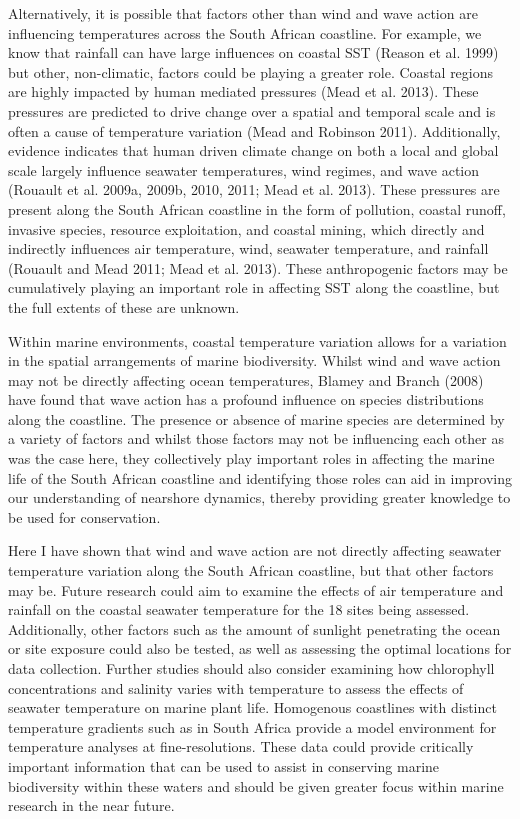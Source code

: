 \documentclass[12pt,]{article}
\begin{document}
Alternatively, it is possible that factors other than wind and wave
action are influencing temperatures across the South African coastline.
For example, we know that rainfall can have large influences on coastal
SST (Reason et al. 1999) but other, non-climatic, factors could be
playing a greater role. Coastal regions are highly impacted by human
mediated pressures (Mead et al. 2013). These pressures are predicted to
drive change over a spatial and temporal scale and is often a cause of
temperature variation (Mead and Robinson 2011). Additionally, evidence
indicates that human driven climate change on both a local and global
scale largely influence seawater temperatures, wind regimes, and wave
action (Rouault et al. 2009a, 2009b, 2010, 2011; Mead et al. 2013).
These pressures are present along the South African coastline in the
form of pollution, coastal runoff, invasive species, resource
exploitation, and coastal mining, which directly and indirectly
influences air temperature, wind, seawater temperature, and rainfall
(Rouault and Mead 2011; Mead et al. 2013). These anthropogenic factors
may be cumulatively playing an important role in affecting SST along the
coastline, but the full extents of these are unknown.

Within marine environments, coastal temperature variation allows for a
variation in the spatial arrangements of marine biodiversity. Whilst
wind and wave action may not be directly affecting ocean temperatures,
Blamey and Branch (2008) have found that wave action has a profound
influence on species distributions along the coastline. The presence or
absence of marine species are determined by a variety of factors and
whilst those factors may not be influencing each other as was the case
here, they collectively play important roles in affecting the marine
life of the South African coastline and identifying those roles can aid
in improving our understanding of nearshore dynamics, thereby providing
greater knowledge to be used for conservation.

Here I have shown that wind and wave action are not directly affecting
seawater temperature variation along the South African coastline, but
that other factors may be. Future research could aim to examine the
effects of air temperature and rainfall on the coastal seawater
temperature for the 18 sites being assessed. Additionally, other factors
such as the amount of sunlight penetrating the ocean or site exposure
could also be tested, as well as assessing the optimal locations for
data collection. Further studies should also consider examining how
chlorophyll concentrations and salinity varies with temperature to
assess the effects of seawater temperature on marine plant life.
Homogenous coastlines with distinct temperature gradients such as in
South Africa provide a model environment for temperature analyses at
fine-resolutions. These data could provide critically important
information that can be used to assist in conserving marine biodiversity
within these waters and should be given greater focus within marine
research in the near future.
\end{document}
